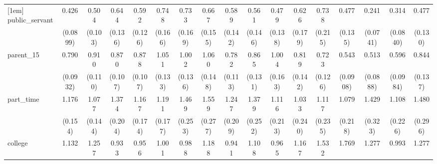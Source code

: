 {\begin{tabular}{l*{16}{c}}
[1em]
public\_servant      &       0.426\sym{***}&       0.504\sym{***}&       0.644\sym{*}  &       0.592\sym{*}  &       0.748         &       0.733         &       0.667         &       0.589\sym{*}  &       0.561\sym{*}  &       0.479\sym{*}  &       0.626         &       0.738         &       0.477\sym{**} &       0.241\sym{***}&       0.314\sym{***}&       0.477\sym{**} \\
                    &    (0.0899)         &     (0.103)         &     (0.136)         &     (0.126)         &     (0.166)         &     (0.169)         &     (0.155)         &     (0.142)         &     (0.146)         &     (0.138)         &     (0.179)         &     (0.215)         &     (0.135)         &    (0.0741)         &    (0.0840)         &     (0.130)         \\
[1em]
parent\_15           &       0.790\sym{*}  &       0.910         &       0.870         &       0.878         &       1.051         &       1.002         &       1.060         &       0.782         &       0.865         &       1.004         &       0.819         &       0.723         &       0.543\sym{***}&       0.513\sym{***}&       0.596\sym{**} &       0.844         \\
                    &    (0.0932)         &     (0.110)         &     (0.107)         &     (0.107)         &     (0.133)         &     (0.136)         &     (0.148)         &     (0.113)         &     (0.131)         &     (0.163)         &     (0.142)         &     (0.126)         &    (0.0908)         &    (0.0888)         &    (0.0984)         &     (0.137)         \\
[1em]
part\_time           &       1.176         &       1.077         &       1.374\sym{*}  &       1.167         &       1.191         &       1.469\sym{*}  &       1.559\sym{*}  &       1.247         &       1.379         &       1.116         &       1.033         &       1.117         &       1.079         &       1.429         &       1.108         &       1.480\sym{*}  \\
                    &     (0.154)         &     (0.144)         &     (0.204)         &     (0.174)         &     (0.177)         &     (0.253)         &     (0.277)         &     (0.209)         &     (0.252)         &     (0.213)         &     (0.240)         &     (0.235)         &     (0.218)         &     (0.323)         &     (0.226)         &     (0.296)         \\
[1em]
college             &       1.132         &       1.257         &       0.933         &       0.956         &       1.001         &       0.988         &       1.188         &       0.941         &       1.108         &       0.965         &       1.167         &       1.532\sym{*}  &       1.769\sym{**} &       1.277         &       0.993         &       1.277         \\

\end{tabular}}
